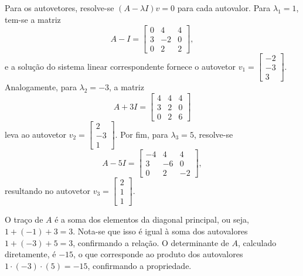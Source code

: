 \begin{resolution}
  Para os autovetores, resolve-se \( (A - \lambda I)v = 0 \) para cada autovalor. Para \( \lambda_1 = 1 \), tem-se a matriz
  \[
    A - I = \begin{bmatrix}
      0 & 4  & 4 \\
      3 & -2 & 0 \\
      0 & 2  & 2
    \end{bmatrix},
  \]
  e a solução do sistema linear correspondente fornece o autovetor \( v_1 = \begin{bmatrix} -2 \\ -3 \\ 3 \end{bmatrix} \). Analogamente, para \( \lambda_2 = -3 \), a matriz
  \[
    A + 3I = \begin{bmatrix}
      4 & 4 & 4 \\
      3 & 2 & 0 \\
      0 & 2 & 6
    \end{bmatrix}
  \]
  leva ao autovetor \( v_2 = \begin{bmatrix} 2 \\ -3 \\ 1 \end{bmatrix} \). Por fim, para \( \lambda_3 = 5 \), resolve-se
  \[
    A - 5I = \begin{bmatrix}
      -4 & 4  & 4  \\
      3  & -6 & 0  \\
      0  & 2  & -2
    \end{bmatrix},
  \]
  resultando no autovetor \( v_3 = \begin{bmatrix} 2 \\ 1 \\ 1 \end{bmatrix} \).

  O traço de \( A \) é a soma dos elementos da diagonal principal, ou seja, \( 1 + (-1) + 3 = 3 \). Nota-se que isso é igual à soma dos autovalores \( 1 + (-3) + 5 = 3 \), confirmando a relação. O determinante de \( A \), calculado diretamente, é \( -15 \), o que corresponde ao produto dos autovalores \( 1 \cdot (-3) \cdot (5) = -15 \), confirmando a propriedade.
\end{resolution}

